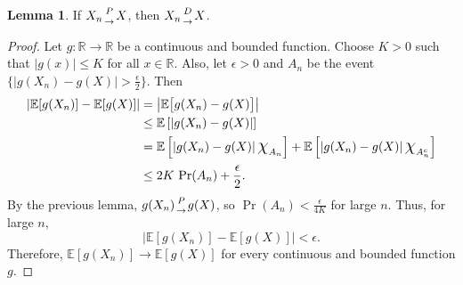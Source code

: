 \documentclass{article}
\theoremstyle{definition}\newtheorem{definition}{DEF}
\theoremstyle{definition}\newtheorem{example}{Ex}
\theoremstyle{lemma}\newtheorem{lemma}{Lemma}
\theoremstyle{corrolary}\newtheorem{corrolary}{Cor}
\begin{document}
\begin{lemma}
If $X_n {P \atop \rightarrow} X$, then $X_n {D \atop \rightarrow} X$.
\end{lemma}
\begin{proof}
Let $g: \mathbb{R}\rightarrow \mathbb{R}$ be a continuous and bounded function.
Choose $K>0$ such that $|g(x)|\leq K$ for all $x\in \mathbb{R}$.
Also, let $\epsilon>0$ and $A_n$ be the event $\{|g(X_n) - g(X)|>\frac{\epsilon}{2}\}$.
Then
\begin{align*}
\left|\mathbb{E}[g(X_n)] - \mathbb{E}[g(X)]\right|
&= \left|\mathbb{E}\bigl[g(X_n) - g(X)\bigr]\right| \\
&\le \mathbb{E}\left[\left|g(X_n) - g(X)\right|\right] \\
&= \mathbb{E}\left[\left|g(X_n) - g(X)\right|\mbox{\Large$\chi$}_{A_n}\right]
+ \mathbb{E}\left[\left|g(X_n) - g(X)\right|\mbox{\Large$\chi$}_{A_n^c}\right] \\
&\le 2K\,\Pr(A_n) + \frac{\epsilon}{2}.
\end{align*}
By the previous lemma, $g(X_n) {P\atop \rightarrow}g(X)$, so $\Pr(A_n)<\frac{\epsilon}{4K}$ for large $n$.
Thus, for large $n$,
\begin{equation*}
\left|\mathbb{E}[g(X_n)] - \mathbb{E}[g(X)]\right|<\epsilon.
\end{equation*}
Therefore, $\mathbb{E}[g(X_n)]\rightarrow \mathbb{E}[g(X)]$ for every continuous and bounded function $g$.


\end{proof}
\end{document}
